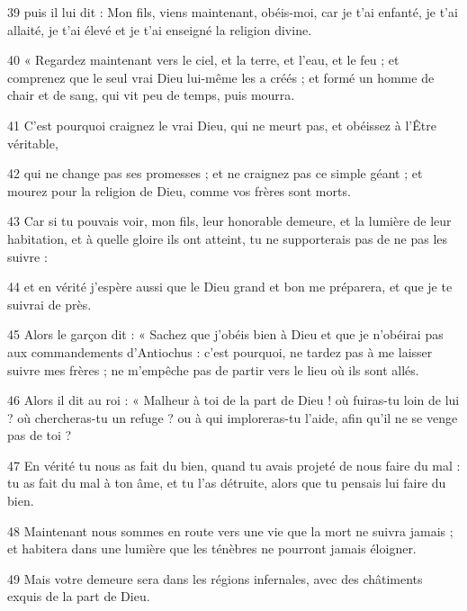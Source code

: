 \par 39 puis il lui dit : Mon fils, viens maintenant, obéis-moi, car je t'ai enfanté, je t'ai allaité, je t'ai élevé et je t'ai enseigné la religion divine.

\par 40 « Regardez maintenant vers le ciel, et la terre, et l'eau, et le feu ; et comprenez que le seul vrai Dieu lui-même les a créés ; et formé un homme de chair et de sang, qui vit peu de temps, puis mourra.

\par 41 C'est pourquoi craignez le vrai Dieu, qui ne meurt pas, et obéissez à l'Être véritable,

\par 42 qui ne change pas ses promesses ; et ne craignez pas ce simple géant ; et mourez pour la religion de Dieu, comme vos frères sont morts.

\par 43 Car si tu pouvais voir, mon fils, leur honorable demeure, et la lumière de leur habitation, et à quelle gloire ils ont atteint, tu ne supporterais pas de ne pas les suivre :

\par 44 et en vérité j'espère aussi que le Dieu grand et bon me préparera, et que je te suivrai de près.

\par 45 Alors le garçon dit : « Sachez que j'obéis bien à Dieu et que je n'obéirai pas aux commandements d'Antiochus : c'est pourquoi, ne tardez pas à me laisser suivre mes frères ; ne m'empêche pas de partir vers le lieu où ils sont allés.

\par 46 Alors il dit au roi : « Malheur à toi de la part de Dieu ! où fuiras-tu loin de lui ? où chercheras-tu un refuge ? ou à qui imploreras-tu l'aide, afin qu'il ne se venge pas de toi ?

\par 47 En vérité tu nous as fait du bien, quand tu avais projeté de nous faire du mal : tu as fait du mal à ton âme, et tu l'as détruite, alors que tu pensais lui faire du bien.

\par 48 Maintenant nous sommes en route vers une vie que la mort ne suivra jamais ; et habitera dans une lumière que les ténèbres ne pourront jamais éloigner.

\par 49 Mais votre demeure sera dans les régions infernales, avec des châtiments exquis de la part de Dieu.

